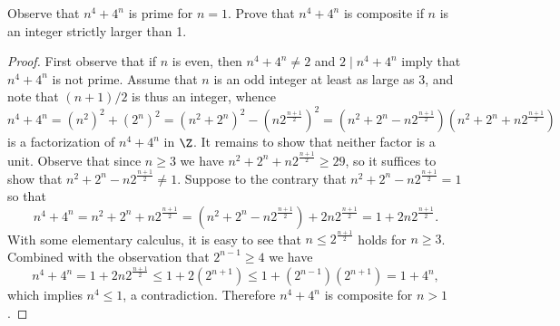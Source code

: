 \documentclass[10pt]{amsart}
\begin{document}
\begin{thm}\label{ex3}
  Observe that $n^4 + 4^n$ is prime for $n = 1$.
  Prove that $n^4 + 4^n$ is composite if $n$ is an integer strictly larger than 1.

  \begin{proof}
    First observe that if $n$ is even, then $n^4 + 4^n \neq 2$ and $2 \mid n^4 + 4^n$ imply that $n^4 + 4^n$ is not prime.
    Assume that $n$ is an odd integer at least as large as 3, and note that $(n+1)/2$ is thus an integer, whence
    $$n^4 + 4^n = (n^2)^2 + (2^n)^2 = (n^2 + 2^n)^2 - (n 2^{\frac{n + 1}{2}})^2 = (n^2 + 2^n - n 2^{\frac{n + 1}{2}})(n^2 + 2^n + n 2^{\frac{n + 1}{2}})$$
    is a factorization of $n^4 + 4^n$ in $\Z$.
    It remains to show that neither factor is a unit.
    Observe that since $n \geq 3$ we have $n^2 + 2^n + n 2^{\frac{n + 1}{2}} \geq 29$, so it suffices to show that $n^2 + 2^n - n 2^{\frac{n + 1}{2}} \neq 1$.
    Suppose to the contrary that 
    $n^2 + 2^n - n 2^{\frac{n + 1}{2}} = 1$
    so that
    $$n^4 + 4^n = n^2 + 2^n + n 2^{\frac{n + 1}{2}} = (n^2 + 2^n - n 2^{\frac{n + 1}{2}}) + 2n2^{\frac{n + 1}{2}}= 1 + 2n2^{\frac{n + 1}{2}}.$$
    With some elementary calculus, it is easy to see that $n \leq 2^{\frac{n+1}{2}}$ holds for $n \geq 3$.
    Combined with the observation that $2^{n-1} \geq 4$ we have
    $$n^4 + 4^n =  1 + 2n2^{\frac{n + 1}{2}} \leq 1 + 2(2^{n+1}) \leq 1 + (2^{n-1})(2^{n+1}) = 1 + 4^n,$$
    which implies $n^4 \leq 1$, a contradiction.
    Therefore $n^4 + 4^n$ is composite for $n > 1$.

\end{proof}
\end{thm}
\end{document}
